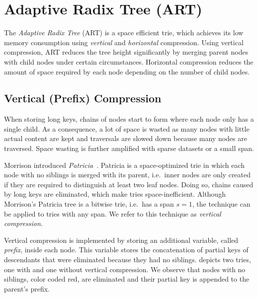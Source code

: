 \documentclass[abstracton,12pt]{scrartcl}
\theoremstyle{definition}
\begin{document}
\newpage

\section{Adaptive Radix Tree (ART)}
\label{sec:art}

The \textit{Adaptive Radix Tree} (ART) is a space efficient trie, which
achieves its low memory consumption using \textit{vertical} and 
\textit{horizontal} compression. Using vertical compression, ART reduces
the tree height significantly by merging parent nodes with child nodes
under certain circumstances. Horizontal compression reduces the amount
of space required by each node depending on the number of child nodes.

\subsection{Vertical (Prefix) Compression}
\label{sec:vertical-compression}

When storing long keys, chains of nodes start to form where each node only
has a single child. As a consequence, a lot of space is wasted as many nodes
with little actual content are kept and traversals are slowed down because
many nodes are traversed. Space wasting is further amplified with sparse
datasets or a small span.

Morrison introduced \textit{Patricia}~\cite{morrison1968patricia}. 
Patricia is a space-optimized trie in which
each node with no siblings is merged with its parent, i.e.\ inner nodes
are only created if they are required to distinguish at least two leaf nodes. 
Doing so, chains caused by long keys are eliminated, which make tries 
space-inefficient. Although Morrison's Patricia tree is a bitwise trie, i.e.\ 
has a span $s=1$, the technique can be applied to tries with any span.
We refer to this technique as \textit{vertical compression}.

Vertical compression is implemented by storing an additional variable, called
\textit{prefix}, inside each node. This variable stores the concatenation
of partial keys of descendants that were eliminated because they had no 
siblings. \Cref{fig:vertical-compression} depicts two tries, one with and one 
without vertical compression. We observe that nodes with no siblings, color 
coded red, are eliminated and their partial key is appended to the parent's 
prefix. 
\end{document}
